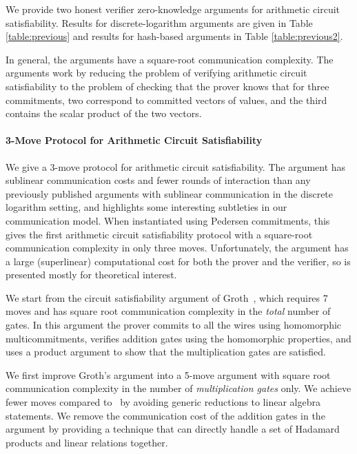 We provide two honest verifier zero-knowledge arguments for arithmetic circuit satisfiability. Results for discrete-logarithm arguments are given in Table \ref{table:previous} and results for hash-based arguments in Table \ref{table:previous2}.

In general, the arguments have a square-root communication complexity. The arguments work by reducing the problem of verifying arithmetic circuit satisfiability to the problem of checking that the prover knows that for three commitments, two correspond to committed vectors of values, and the third contains the scalar product of the two vectors. 

\paragraph{3-Move Protocol for Arithmetic Circuit Satisfiability}

We give a 3-move protocol for arithmetic circuit satisfiability. The argument has sublinear communication costs and fewer rounds of interaction than any previously published arguments with sublinear communication in the discrete logarithm setting, and highlights some interesting subtleties in our communication model. When instantiated using Pedersen commitments, this gives the first arithmetic circuit satisfiability protocol with a square-root communication complexity in only three moves. Unfortunately, the argument has a large (superlinear) computational cost for both the prover and the verifier, so is presented mostly for theoretical interest.


We start from the circuit satisfiability argument of Groth~\cite{Groth2009b}, which requires 7 moves and has square root communication complexity in the \emph{total} number of gates. In this argument the prover commits to all the wires using homomorphic multicommitments, verifies addition gates using the homomorphic properties, and uses a product argument to show that the multiplication gates are satisfied.

We first improve Groth's argument into a 5-move argument with square root communication complexity in the number of \emph{multiplication gates} only.
%
We achieve fewer moves compared to~\cite{Groth2009b} by avoiding generic reductions to linear algebra statements.
%
We remove the communication cost of the addition gates in the argument by providing a technique that can directly handle a set of Hadamard products and linear relations together.

